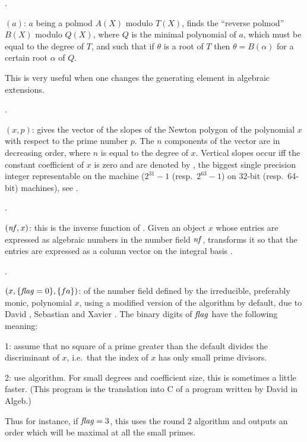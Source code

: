 .

$(a)$: $a$ being a polmod $A(X)$ modulo $T(X)$, finds
the ``reverse polmod'' $B(X)$ modulo $Q(X)$, where $Q$ is the minimal
polynomial of $a$, which must be equal to the degree of $T$, and such that if
$\theta$ is a root of $T$ then $\theta=B(\alpha)$ for a certain root $\alpha$
of $Q$.

This is very useful when one changes the generating element in algebraic
extensions.

.

$(x,p)$: gives the vector of the slopes of the Newton
polygon of the polynomial $x$ with respect to the prime number $p$. The $n$
components of the vector are in decreasing order, where $n$ is equal to the
degree of $x$. Vertical slopes occur iff the constant coefficient of $x$ is
zero and are denoted by , the biggest single precision
integer representable on the machine ($2^{31}-1$ (resp.~$2^{63}-1$) on 32-bit
(resp.~64-bit) machines), see .

.

$(\hbox{\it nf\/},x)$: this is the inverse function of
. Given an object $x$ whose entries are expressed as
algebraic numbers in the number field $\hbox{\it nf\/}$, transforms it so that the
entries are expressed as a column vector on the integral basis
.

.

$(x,\{\hbox{\it f\kern0pt lag\/}=0\},\{fa\})$:  of the number
field defined by the irreducible, preferably monic, polynomial $x$, using a
modified version of the  algorithm by default, due to David
, Sebastian  and Xavier . The binary digits
of $\hbox{\it f\kern0pt lag\/}$ have the following meaning:

1: assume that no square of a prime greater than the default 
divides the discriminant of $x$, i.e.~that the index of $x$ has only small
prime divisors.

2: use  algorithm. For small degrees and coefficient size, this
is sometimes a little faster. (This program is the translation into C of a
program written by David  in Algeb.)

Thus for instance, if $\hbox{\it f\kern0pt lag\/}=3$, this uses the round 2 algorithm and outputs
an order which will be maximal at all the small primes.

